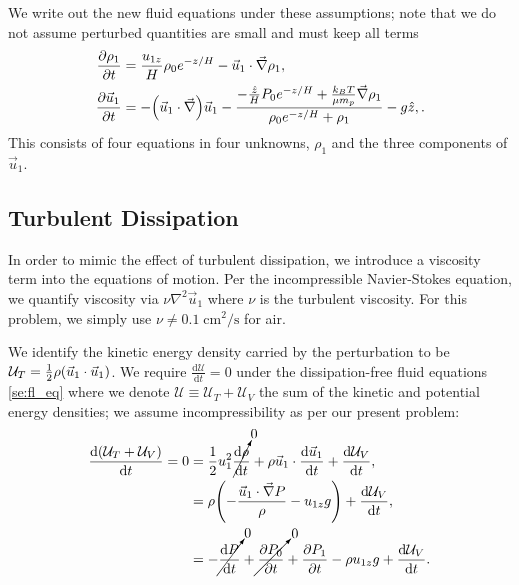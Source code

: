 \documentclass[11pt,
        usenames, %
        dvipsnames %
    ]{report}
\newcommand*{\rd}[2]{\frac{\mathrm{d}#1}{\mathrm{d}#2}}
\newcommand*{\pd}[2]{\frac{\partial#1}{\partial#2}}
\DeclarePairedDelimiter\p{\lparen}{\rparen}
\begin{document}
We write out the new fluid equations under these assumptions; note that we do
not assume perturbed quantities are small and must keep all terms
\begin{subequations}\label{se:lin_eq}
    \begin{align}
        \pd{\rho_1}{t} &= \frac{u_{1z}}{H}\rho_0e^{-z/H} - \vec{u}_1 \cdot
            \vec{\nabla} \rho_1, \label{eq:lin_eq.cont}\\
        \pd{\vec{u}_1}{t} &=
            -\p*{\vec{u}_1 \cdot \vec{\nabla}}\vec{u}_1
            -\frac{-\frac{\hat{z}}{H}P_0e^{-z/H} + \frac{k_BT}{\mu m_p}
                \vec{\nabla} \rho_1}{\rho_0e^{-z/H} + \rho_1}
                - g\hat{z}, \label{eq:lin_eq.mom}.
    \end{align}
\end{subequations}
This consists of four equations in four unknowns, $\rho_1$ and the three
components of $\vec{u}_1$.

\subsection{Turbulent Dissipation}

In order to mimic the effect of turbulent dissipation, we introduce a viscosity
term into the equations of motion. Per the incompressible Navier-Stokes
equation, we quantify viscosity via $\nu \nabla^2 \vec{u}_1$ where $\nu$ is the
turbulent viscosity. For this problem, we simply use $\nu \neq
0.1\;\mathrm{cm^2/s}$ for air.

We identify the kinetic energy density carried by the perturbation to be
$\mathcal{U}_T = \frac{1}{2}\rho \p*{\vec{u}_1 \cdot \vec{u}_1}$. We require
$\rd{\mathcal{U}}{t} = 0$ under the dissipation-free fluid equations
\autoref{se:fl_eq} where we denote $\mathcal{U} \equiv \mathcal{U}_T +
\mathcal{U}_V$ the sum of the kinetic and potential energy densities; we assume
incompressibility as per our present problem:
\begin{align}
    \rd{\p*{\mathcal{U}_T + \mathcal{U}_V}}{t} = 0
        &= \frac{1}{2}u_1^2 \cancelto{0}{\rd{\rho}{t}}
        + \rho \vec{u}_1 \cdot \rd{\vec{u}_1}{t} + \rd{\mathcal{U}_V}{t}
        ,\nonumber\\
        &= \rho \p*{
                -\frac{\vec{u}_1 \cdot \vec{\nabla}P}{\rho} - u_{1z}g
            } + \rd{\mathcal{U}_V}{t},\nonumber\\
        &= -\cancelto{0}{\rd{P}{t}} + \cancelto{0}{\pd{P_0}{t}}
            + \pd{P_1}{t} - \rho u_{1z}g + \rd{\mathcal{U}_V}{t}.
\end{align}
\end{document}
